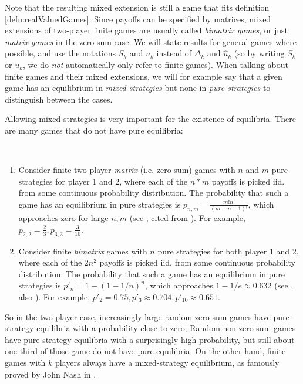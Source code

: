 \documentclass[a4paper]{scrreprt}
\begin{document}
    Note that the resulting mixed extension is still a game that fits definition \ref{defn:realValuedGames}.
    Since payoffs can be specified by matrices, mixed extensions of two-player finite %
    games are usually called \emph{bimatrix games}, or just \emph{matrix games} in the zero-sum case.
    We will state results for general games where possible, and use the notations $S_k$ and $u_k$ instead of $\Delta_k$ and $\hat{u}_k$ (so by writing $S_k$ or $u_k$, we do \emph{not} automatically only refer to finite games). When talking about finite games and their mixed extensions, we will for example say that a given game has an equilibrium in \emph{mixed strategies} but none in \emph{pure strategies} to distinguish between the cases.
    
    Allowing mixed strategies is very important for the existence of equilibria. There are many games that do not have pure equilibria: 
    \begin{thm}~
        \begin{enumerate}
            \item
            Consider finite two-player \emph{matrix} (i.e. zero-sum) games with $n$ and $m$ pure strategies for player 1 and 2, where each of the $n*m$ payoffs is picked iid. from some continuous probability distribution.
            The probability that such a game has an equilibrium in pure strategies is $p_{n, m} = \frac{m! n!}{(m+n-1)!}$, which approaches zero for large $n, m$ (see \cite[p.15]{bib:matsumotoGameTheory}, cited from \cite{bib:goldbergProbabilityOfEquilibria}).
            For example, $p_{2, 2} = \frac{2}{3}, p_{3, 3}=\frac{3}{10}$.
            
            \item 
            Consider finite \emph{bimatrix} games with $n$ pure strategies for both player 1 and 2, where each of the $2n^2$ payoffs is picked iid. from some continuous probability distribution.
            The probability that such a game has an equilibrium in pure strategies is $p'_{n} = 1 - (1-1/n)^n$, which approaches $1 - 1/e \approx 0.632$
            (see \cite{bib:goldbergProbabilityOfEquilibria}, also \cite[Exercise 1.2]{bib:nisanAlgorithmicGameTheoryCh1Basic}).
            For example, $p'_{2} = 0.75, p'_{3} \approx 0.704, p'_{10} \approx 0.651$.
        \end{enumerate}
    \end{thm}
    So in the two-player case, increasingly large random zero-sum games have pure-strategy equilibria with a probability close to zero; Random non-zero-sum games have pure-strategy equilibria with a surprisingly high probability, but still about one third of those game do not have pure equilibria.
    On the other hand, finite games with $k$ players always have a mixed-strategy equilibrium, as famously proved by John Nash in \cite{bib:nashOnePageProofOfEquilibria}.
    
\end{document}
